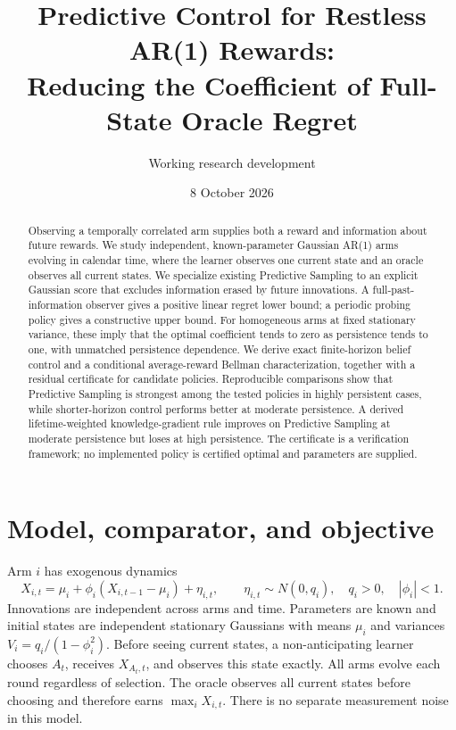 \documentclass[11pt]{article}
\title{Predictive Control for Restless AR(1) Rewards:\\Reducing the Coefficient of Full-State Oracle Regret}
\author{Working research development}
\date{8 October 2026}
\begin{document}
\maketitle
\begin{abstract}
Observing a temporally correlated arm supplies both a reward and information about future rewards. We study independent, known-parameter Gaussian AR(1) arms evolving in calendar time, where the learner observes one current state and an oracle observes all current states. We specialize existing Predictive Sampling to an explicit Gaussian score that excludes information erased by future innovations. A full-past-information observer gives a positive linear regret lower bound; a periodic probing policy gives a constructive upper bound. For homogeneous arms at fixed stationary variance, these imply that the optimal coefficient tends to zero as persistence tends to one, with unmatched persistence dependence. We derive exact finite-horizon belief control and a conditional average-reward Bellman characterization, together with a residual certificate for candidate policies. Reproducible comparisons show that Predictive Sampling is strongest among the tested policies in highly persistent cases, while shorter-horizon control performs better at moderate persistence. A derived lifetime-weighted knowledge-gradient rule improves on Predictive Sampling at moderate persistence but loses at high persistence. The certificate is a verification framework; no implemented policy is certified optimal and parameters are supplied.
\end{abstract}

\section{Model, comparator, and objective}
Arm $i$ has exogenous dynamics
\begin{equation}
X_{i,t}=\mu_i+\phi_i(X_{i,t-1}-\mu_i)+\eta_{i,t},\qquad
\eta_{i,t}\sim N(0,q_i),\quad q_i>0,\quad |\phi_i|<1.
\label{eq:model}
\end{equation}
Innovations are independent across arms and time. Parameters are known and initial states are independent stationary Gaussians with means $\mu_i$ and variances $V_i=q_i/(1-\phi_i^2)$. Before seeing current states, a non-anticipating learner chooses $A_t$, receives $X_{A_t,t}$, and observes this state exactly. All arms evolve each round regardless of selection. The oracle observes all current states before choosing and therefore earns $\max_iX_{i,t}$. There is no separate measurement noise in this model.
\end{document}
